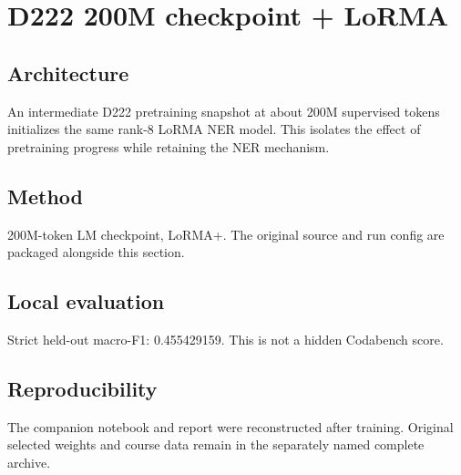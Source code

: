 \section{D222 200M checkpoint + LoRMA}
\subsection{Architecture}
An intermediate D222 pretraining snapshot at about 200M supervised tokens initializes the same rank-8 LoRMA NER model. This isolates the effect of pretraining progress while retaining the NER mechanism.
\subsection{Method}
200M-token LM checkpoint, LoRMA+. The original source and run config are packaged alongside this section.
\subsection{Local evaluation}
Strict held-out macro-F1: 0.455429159. This is not a hidden Codabench score.
\subsection{Reproducibility}
The companion notebook and report were reconstructed after training. Original selected weights and course data remain in the separately named complete archive.

